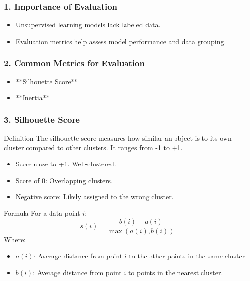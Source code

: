 \documentclass[aspectratio=169]{beamer}
\begin{document}
\begin{frame}[fragile]
    \frametitle{1. Importance of Evaluation}
    \begin{itemize}
        \item Unsupervised learning models lack labeled data.
        \item Evaluation metrics help assess model performance and data grouping.
    \end{itemize}
\end{frame}

\begin{frame}[fragile]
    \frametitle{2. Common Metrics for Evaluation}
    \begin{itemize}
        \item **Silhouette Score**
        \item **Inertia**
    \end{itemize}
\end{frame}

\begin{frame}[fragile]
    \frametitle{3. Silhouette Score}
    \begin{block}{Definition}
        The silhouette score measures how similar an object is to its own cluster compared to other clusters. It ranges from -1 to +1.
        \begin{itemize}
            \item Score close to +1: Well-clustered.
            \item Score of 0: Overlapping clusters.
            \item Negative score: Likely assigned to the wrong cluster.
        \end{itemize}
    \end{block}
    \begin{block}{Formula}
        For a data point $i$:
        \begin{equation}
            s(i) = \frac{b(i) - a(i)}{\max(a(i), b(i))}
        \end{equation}
        Where:
        \begin{itemize}
            \item $a(i)$: Average distance from point $i$ to the other points in the same cluster.
            \item $b(i)$: Average distance from point $i$ to points in the nearest cluster.
        \end{itemize}
    \end{block}
\end{frame}
\end{document}
